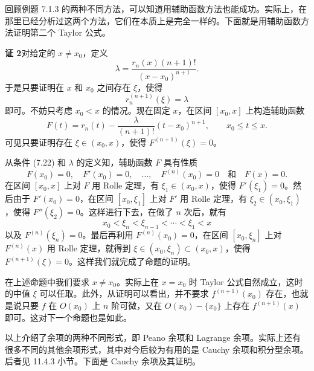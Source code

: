 回顾例题 7.1.3 的两种不同方法，可以知道用辅助函数方法也能成功。实际上，在那里已经分析过这两个方法，它们在本质上是完全一样的。下面就是用辅助函数方法证明第二个 Taylor 公式。

\begin{xproof}
\textbf{证 2}\quad 对给定的 $x\neq x_0$，定义
\[
  \lambda=\frac{r_n(x)(n+1)!}{(x-x_0)^{n+1}}.
\]
于是只要证明在 $x$ 和 $x_0$ 之间存在 $\xi$，使得
\[
  r_n^{(n+1)}(\xi)=\lambda
\]
即可。不妨只考虑 $x_0<x$ 的情况。现在固定 $x$，在区间 $[x_0,x]$ 上构造辅助函数
\[
  F(t)=r_n(t)-\frac{\lambda}{(n+1)!}(t-x_0)^{n+1},\qquad x_0\leqslant t\leqslant x.
\]
可见只要证明存在 $\xi\in(x_0,x)$，使得 $F^{(n+1)}(\xi)=0$。

从条件 (7.22) 和 $\lambda$ 的定义知，辅助函数 $F$ 具有性质
\[
  F(x_0)=0,\quad F'(x_0)=0,\quad\ldots,\quad F^{(n)}(x_0)=0\quad\text{和}\quad F(x)=0.
\]
在区间 $[x_0,x]$ 上对 $F$ 用 Rolle 定理，有 $\xi_1\in(x_0,x)$，使得 $F'(\xi_1)=0$。然后由于 $F'(x_0)=0$，在区间 $[x_0,\xi_1]$ 上对 $F'$ 用 Rolle 定理，有 $\xi_2\in(x_0,\xi_1)$，使得 $F''(\xi_2)=0$。这样进行下去，在做了 $n$ 次后，就有
\[
  x_0<\xi_n<\xi_{n-1}<\cdots<\xi_1<x
\]
以及 $F^{(n)}(\xi_n)=0$。最后再利用 $F^{(n)}(x_0)=0$，在区间 $[x_0,\xi_n]$ 上对 $F^{(n)}(x)$ 用 Rolle 定理，就得到 $\xi\in(x_0,\xi_n)\subset(x_0,x)$，使得 $F^{(n+1)}(\xi)=0$。这样我们就完成了命题的证明。
\end{xproof}

\begin{xremark}
在上述命题中我们要求 $x\neq x_0$。实际上在 $x=x_0$ 时 Taylor 公式自然成立，这时的中值 $\xi$ 可以任取。此外，从证明可以看出，并不要求 $f^{(n+1)}(x_0)$ 存在，也就是说只要 $f$ 在 $O(x_0)$ 上 $n$ 阶可微，又在 $O(x_0)-\{x_0\}$ 上存在 $f^{(n+1)}(x)$ 即可。这对下一个命题也是如此。
\end{xremark}

以上介绍了余项的两种不同形式，即 Peano 余项和 Lagrange 余项。实际上还有很多不同的其他余项形式，其中对今后较为有用的是 Cauchy 余项和积分型余项。后者见 11.4.3 小节。下面是 Cauchy 余项及其证明。

